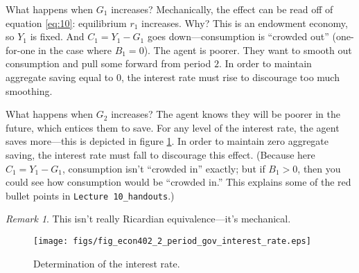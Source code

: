 \documentclass[12pt]{pracjourn_rwr}
\theoremstyle{remark}
\newtheorem{remark}{Remark}
\begin{document}
What happens when $G_{1}$ increases?
Mechanically, the effect can be read off of equation \eqref{eq:10}:
equilibrium $r_{1}$ increases.
Why?
This is an endowment economy, so $Y_{1}$ is fixed.
And $C_{1} = Y_{1} - G_{1}$ goes down---consumption is ``crowded out'' (one-for-one in the case where $B_{1} = 0$).
The agent is poorer.
They want to smooth out consumption and pull some forward from period $2$.
In order to maintain aggregate saving equal to $0$, the interest rate must rise to discourage too much smoothing.

What happens when $G_{2}$ increases?
The agent knows they will be poorer in the future,
which entices them to save.
For any level of the interest rate, the agent saves more---this is depicted in figure \ref{fig:interest-rate}.
In order to maintain zero aggregate saving, the interest rate must fall to discourage this effect.
(Because here $C_{1} = Y_{1} - G_{1}$, consumption isn't ``crowded in'' exactly;
but if $B_{1} > 0$, then you could see how consumption would be ``crowded in.''
This explains some of the red bullet points in \texttt{Lecture 10\_handouts}.)

\begin{remark}
\label{remark:3}
This isn't really Ricardian equivalence---it's mechanical.
\end{remark}


\begin{figure}[htbp]
\centerline{\texttt{[image: figs/fig\_econ402\_2\_period\_gov\_interest\_rate.eps]}}
\caption[]{\label{fig:interest-rate} Determination of the interest rate.}
\end{figure}



\end{document}
